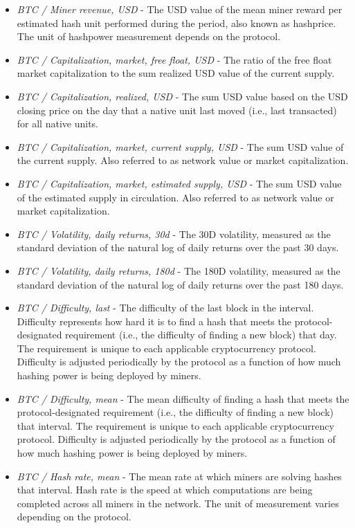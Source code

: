 \begin{itemize}
    \item \textit{BTC / Miner revenue, USD} - The USD value of the mean miner reward per estimated hash unit performed during the period, also known as hashprice. The unit of hashpower measurement depends on the protocol.
    \item \textit{BTC / Capitalization, market, free float, USD} - The ratio of the free float market capitalization to the sum realized USD value of the current supply.
    \item \textit{BTC / Capitalization, realized, USD} - The sum USD value based on the USD closing price on the day that a native unit last moved (i.e., last transacted) for all native units.
    \item \textit{BTC / Capitalization, market, current supply, USD} - The sum USD value of the current supply. Also referred to as network value or market capitalization.
    \item \textit{BTC / Capitalization, market, estimated supply, USD} - The sum USD value of the estimated supply in circulation. Also referred to as network value or market capitalization.
    \item \textit{BTC / Volatility, daily returns, 30d} - The 30D volatility, measured as the standard deviation of the natural log of daily returns over the past 30 days.
    \item \textit{BTC / Volatility, daily returns, 180d} - The 180D volatility, measured as the standard deviation of the natural log of daily returns over the past 180 days.
    \item \textit{BTC / Difficulty, last} - The difficulty of the last block in the interval. Difficulty represents how hard it is to find a hash that meets the protocol-designated requirement (i.e., the difficulty of finding a new block) that day. The requirement is unique to each applicable cryptocurrency protocol. Difficulty is adjusted periodically by the protocol as a function of how much hashing power is being deployed by miners.
    \item \textit{BTC / Difficulty, mean} - The mean difficulty of finding a hash that meets the protocol-designated requirement (i.e., the difficulty of finding a new block) that interval. The requirement is unique to each applicable cryptocurrency protocol. Difficulty is adjusted periodically by the protocol as a function of how much hashing power is being deployed by miners.
    \item \textit{BTC / Hash rate, mean} - The mean rate at which miners are solving hashes that interval. Hash rate is the speed at which computations are being completed across all miners in the network. The unit of measurement varies depending on the protocol.

\end{itemize}
